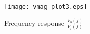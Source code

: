 \begin{figure}[H] \centering
\texttt{[image: vmag\_plot3.eps]}
\caption{Frequency response $\frac{V_o(f)}{V_i(f)}$}
\label{fig:freq_response}
\end{figure}







